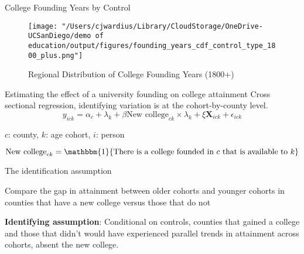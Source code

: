 \documentclass[notes,11pt, aspectratio=169]{beamer}
\newenvironment{wideitemize}{\itemize\addtolength{\itemsep}{10pt}}{\enditemize}
\begin{document}
\begin{frame}{College Founding Years by Control}
    \begin{figure}
        \centering
        \texttt{[image: "/Users/cjwardius/Library/CloudStorage/OneDrive-UCSanDiego/demo of education/output/figures/founding\_years\_cdf\_control\_type\_1800\_plus.png"]}
        \caption{Regional Distribution of College Founding Years (1800+)}
    \end{figure}
\end{frame}


\begin{frame}{Estimating the effect of a university founding on college attainment}
  Cross sectional regression, identifying variation is at the cohort-by-county level.
  \begin{equation}
    y_{ick} = \alpha_c + \lambda_k + \beta \text{New college}_{ck}\times \lambda_k +\xi \bm{X}_{ick} + \epsilon_{ick}
  \end{equation}
  \begin{wideitemize}
    \item $c$: county, $k$: age cohort, $i$: person
    \item $\text{New college}_{ck} = \mathbbm{1}\{\text{There is a college founded in $c$ that is available to $k$}\}$
  \end{wideitemize}
\end{frame}

\begin{frame}{The identification assumption}
\begin{wideitemize}
  \item Compare the gap in attainment between older cohorts and younger cohorts in counties that have a new college versus those that do not
  \item \textbf{Identifying assumption}: Conditional on controls, counties that gained a college and those that didn't would have experienced parallel trends in attainment across cohorts, absent the new college.
\end{wideitemize}
\end{frame}
\end{document}
